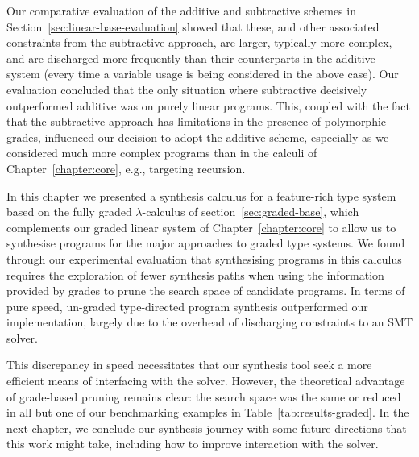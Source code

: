 Our comparative evaluation of the additive and subtractive schemes in
Section~\ref{sec:linear-base-evaluation} showed that these, and other associated
constraints from the subtractive approach, are larger, typically more complex,
and are discharged more frequently than their counterparts in the additive
system (every time a variable usage is being considered in the above case).
Our evaluation concluded that the only situation where subtractive decisively
outperformed additive was on purely linear programs. This, coupled with the fact
that the subtractive approach has limitations in the presence of polymorphic
grades, influenced our decision to adopt the additive scheme, especially as we
considered much more complex programs than in the calculi of
Chapter~\ref{chapter:core}, e.g., targeting recursion.

In this chapter we presented a synthesis calculus for a feature-rich type system
based on the fully graded $\lambda$-calculus of section~\ref{sec:graded-base},
which complements our graded linear system of Chapter~\ref{chapter:core} to
allow us to synthesise programs for the major approaches to graded type systems.
We found through our experimental evaluation that synthesising programs in this
calculus requires the exploration of fewer synthesis paths when using the
information provided by grades to prune the search space of candidate programs.
In terms of pure speed, un-graded type-directed program synthesis outperformed
our implementation, largely due to the overhead of discharging constraints to an
SMT solver. 

This discrepancy in speed necessitates that our synthesis tool seek a more
efficient means of interfacing with the solver. However, the theoretical
advantage of grade-based pruning remains clear: the search space was the same or
reduced in all but one of our benchmarking examples in
Table~\ref{tab:results-graded}. In the next chapter, we conclude our synthesis
journey with some future directions that this work might take, including how to
improve interaction with the solver. 



